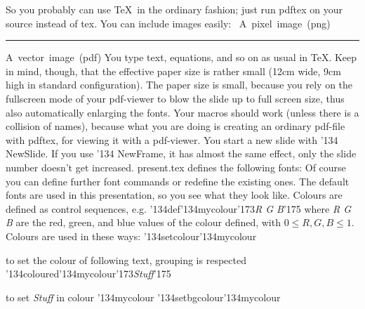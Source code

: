 So you probably can use \TeX\ in the ordinary fashion; just run {\cf pdftex} on your source instead of {\cf tex}.
\NewSlide
You can include images easily:
\hbox{ A pixel image (png)}
\vskip10pt\hrule
\hbox{A vector image (pdf)}
\NewSlide
You type text, equations, and so on as usual in \TeX. Keep in mind, though, that the effective paper size is 
rather small (12cm wide, 9cm high in standard configuration).
The paper size is small, because you rely on the fullscreen mode of your pdf-viewer to blow the slide up to full 
screen size, thus also automatically enlarging the fonts.
Your macros should work (unless there is a collision of names), because what you are doing is creating an ordinary
pdf-file with {\cf pdftex}, for viewing it with a pdf-viewer.
You start a new slide with {\cf\char'134 NewSlide}. If you use {\cf\char'134 NewFrame}, it has almost the same effect, only
the slide number doesn't get increased.
\NewSlide
{\cf present.tex} defines the following fonts:\vskip5pt
{
}
\vskip10pt
Of course you can define further font commands or redefine the existing ones.
The default fonts are used in this presentation, so you see what they look like.
\NewSlide
Colours are defined as control sequences, e.g.
\vskip5pt
{\cf\char'134def\char'134mycolour\char'173}{\it R G B\/}{\cf\char'175}
\vskip5pt
where {\it R G B} are the red, green, and blue values of the colour defined, with
$0\leq R, G, B\leq 1$.
\vskip5pt
Colours are used in these ways:
\vskip5pt
{\cf\char'134setcolour\char'134mycolour} 

to set the colour of following text, grouping is respected
\vskip5pt
{\cf\char'134coloured\char'134mycolour\char'173}{\it Stuff\/}{\cf\char'175} 

to set {\it Stuff} in colour {\cf\char'134mycolour}
\vskip5pt
{\cf\char'134setbgcolour\char'134mycolour}

